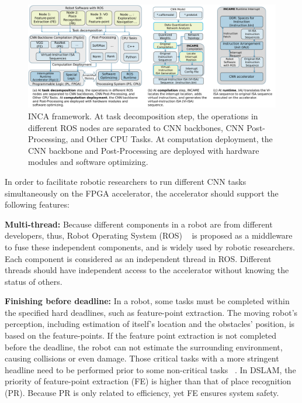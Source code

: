 \begin{figure}[t]
	\centering
    \includegraphics[width=0.99\linewidth]{fig/inca.pdf}
    \caption{ INCA framework. At task decomposition step, the operations in different ROS nodes are separated to CNN backbones, CNN Post-Processing, and Other CPU Tasks. At computation deployment, the CNN backbone and Post-Processing are deployed with hardware modules and software optimizing.  
    }
	\label{fig:inca}
\end{figure}

In order to facilitate robotic researchers to run different CNN tasks simultaneously on the FPGA accelerator, the accelerator should support the following features:

\textbf{Multi-thread:} Because different components in a robot are from different developers, thus, Robot Operating System (ROS)  ~\cite{quigley2009ros} is proposed as a middleware to fuse these independent components, and is widely used by robotic researchers. Each component is considered as an independent thread in ROS. Different threads should have independent access to the accelerator without knowing the status of others.

\textbf{Finishing before deadline:} In a robot, some tasks must be completed within the specified hard deadlines, such as feature-point extraction. The moving robot's perception, including estimation of itself's location and the obstacles' position, is based on the feature-points. If the feature point extraction is not completed before the deadline, the robot can not estimate the surrounding environment, causing collisions or even damage. Those critical tasks with a more stringent headline need to be performed prior to some non-critical tasks ~\cite{RamsauerKLM17}. In DSLAM, the priority of feature-point extraction (FE) is higher than that of place recognition (PR). Because PR is only related to efficiency, yet FE ensures system safety.


